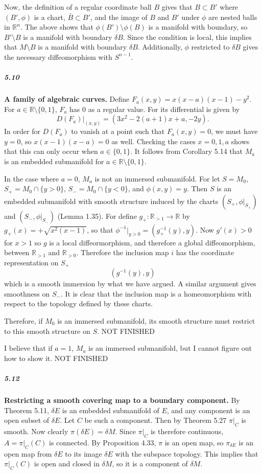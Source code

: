 \documentclass[10pt,letter]{article}
\begin{document}
Now, the definition of a regular coordinate ball $B$ gives that $B \subset B'$ where $(B',\phi)$ is a chart, $\bar{B} \subset B'$, and the image of $B$ and $B'$ under $\phi$ are nested balls in $\mathbb{R}^n$. The above shows that $\phi(B') \setminus \phi(B)$ is a manifold with boundary, so $B' \setminus B$ is a manifold with boundary $\delta B$. Since the condition is local, this implies that $M \setminus B$ is a manifold with boundary $\delta B$. Additionally, $\phi$ restricted to $\delta B$ gives the necessary diffeomorphism with $S^{n-1}$. 

\subparagraph{5.10} {\bf A family of algebraic curves.} Define $F_a(x,y) = x(x-a)(x-1) - y^2$. For $a \in \mathbb{R} \setminus \lbrace 0, 1 \rbrace$, $F_a$ has $0$ as a regular value. For its differential is given by 
\[
D(F_a)\bigg\vert_{(x,y)} = (3x^2-2(a+1)x+a,-2y).
\]
In order for $D(F_a)$ to vanish at a point such that $F_a(x,y) = 0$, we must have $y = 0$, so $x(x-1)(x-a) = 0$ as well. Checking the cases $x=0,1,a$ shows that this can only occur when $a \in \lbrace 0,1 \rbrace$. It follows from Corollary 5.14 that $M_a$ is an embedded submanifold for $a \in \mathbb{R} \setminus \lbrace 0, 1 \rbrace$.

In the case where $a = 0$, $M_a$ is not an immersed submanifold. For let $S = M_0$, $S_+ = M_0 \cap \lbrace y > 0 \rbrace$, $S_- = M_0 \cap \lbrace y < 0 \rbrace$, and $\phi(x,y) = y$. Then $S$ is an embedded submanifold with smooth structure induced by the charts $(S_+,\phi \vert_{S_+})$ and $(S_-,\phi \vert_{S_-})$ (Lemma 1.35). For define $g_+: \mathbb{R}_{> 1} \rightarrow \mathbb{R}$ by $g_+(x) = +\sqrt{x^2(x-1)}$, so that $\phi^{-1}  \vert_{y > 0} = (g_+^{-1}(y),y)$. Now $g'(x) > 0$ for $x > 1$ so $g$ is a local diffeormorphism, and therefore a global diffeomorphism, between $\mathbb{R}_{> 1}$ and $\mathbb{R}_{> 0}$. Therefore the inclusion map $i$ has the coordinate representation on $S_+$
\[
(g^{-1}(y),y)
\]
which is a smooth immersion by what we have argued. A similar argument gives smoothness on $S_-$. It is clear that the inclusion map is a homeomorphism with respect to the topology defined by these charts. 

Therefore, if $M_0$ is an immersed submanifold, its smooth structure must restrict to this smooth structure on $S$. NOT FINISHED

I believe that if $a= 1$, $M_a$ is an immersed submanifold, but I cannot figure out how to show it. NOT FINISHED


\subparagraph{5.12} {\bf Restricting a smooth covering map to a boundary component.} By Theorem 5.11, $\delta E$ is an embedded submanifold of $E$, and any component is an open subset of $\delta E$. Let $C$ be such a component. Then by Theorem 5.27 $\pi \vert_C$ is smooth. Now clearly $\pi(\delta E) = \delta M$. Since $\pi \vert_C$ is therefore continuous, $A = \pi \vert_C(C)$ is connected. By Proposition 4.33, $\pi$ is an open map, so $\pi_{\delta E}$ is an open map from $\delta E$ to its image $\delta E$ with the subspace topology. This implies that $\pi \vert_C(C)$ is open and closed in $\delta M$, so it is a component of $\delta M$. 
\end{document}
